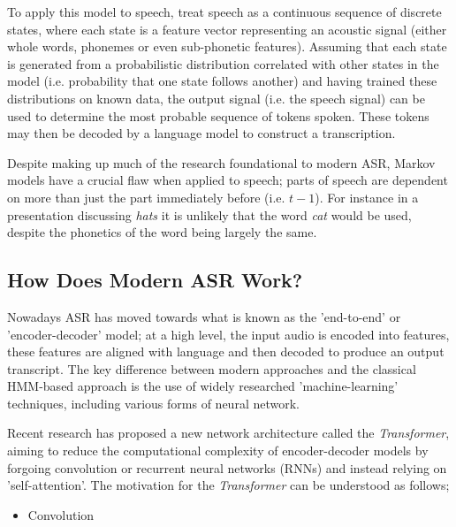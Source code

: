 To apply this model to speech, treat speech as a continuous sequence of discrete states, where each state is a feature vector representing an acoustic signal (either whole words, phonemes or even sub-phonetic features\cite{bengio1999markovian}).
Assuming that each state is generated from a probabilistic distribution correlated with other states in the model\cite{Rabiner1989Feb} (i.e. probability that one state follows another) and having trained these distributions on known data, the output signal (i.e. the speech signal) can be used to determine the most probable sequence of tokens spoken.
These tokens may then be decoded by a language model to construct a transcription\cite{bengio1999markovian}.

Despite making up much of the research foundational to modern ASR, Markov models have a crucial flaw when applied to speech; parts of speech are dependent on more than just the part immediately before (i.e. $t-1$).
For instance in a presentation discussing \emph{hats} it is unlikely that the word \emph{cat} would be used, despite the phonetics of the word being largely the same.

\subsection{How Does Modern ASR Work?}
Nowadays ASR has moved towards what is known as the 'end-to-end' or 'encoder-decoder' model;
at a high level, the input audio is encoded into features, these features are aligned with language and then decoded to produce an output transcript\cite{wang2019overview}.
The key difference between modern approaches and the classical HMM-based approach is the use of widely researched 'machine-learning' techniques, including various forms of neural network\cite{mustafa2019comparative, amodei2016deep, hori2017advances, Kim2017Mar}.

Recent research has proposed a new network architecture called the \emph{Transformer}\cite{vaswani2017attention}, aiming to reduce the computational complexity of encoder-decoder models by forgoing convolution or recurrent neural networks (RNNs) and instead relying on 'self-attention'.
The motivation for the \emph{Transformer} can be understood as follows;

\begin{itemize}
\item Convolution 
\end{itemize}


